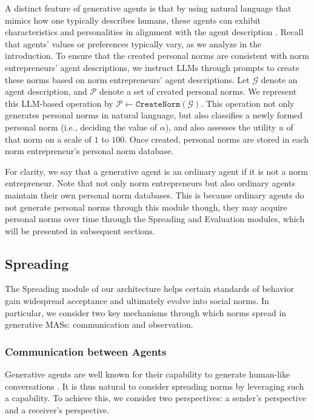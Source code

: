 \documentclass{article}
\begin{document}
A distinct feature of generative agents is that by using natural language that mimics how one typically describes humans, these agents can exhibit characteristics and personalities in alignment with the agent description \cite{shanahan2023role}.
Recall that agents' values or preferences typically vary, as we analyze in the introduction. 
To ensure that the created personal norms are consistent with norm entrepreneurs' agent descriptions, we instruct LLMs through prompts to create these norms based on norm entrepreneurs' agent descriptions. 
Let $\mathcal{G}$ denote an agent description, and $\mathcal{P}$ denote a set of created personal norms. We represent this LLM-based operation by $\mathcal{P} \leftarrow \texttt{CreateNorm}(\mathcal{G})$. This operation not only generates personal norms in natural language, but also classifies a newly formed personal norm (i.e., deciding the value of $\alpha$), and also assesses the utility $u$ of that norm on a scale of $1$ to $100$. Once created, personal norms are stored in  each norm entrepreneur's personal norm database.

For clarity, we say that a generative agent is an ordinary agent if it is not a norm entrepreneur. Note that not only norm entrepreneurs but also ordinary agents maintain their own personal norm databases. This is because ordinary agents do not generate personal norms through this module though, they may acquire personal norms over time through the Spreading and Evaluation modules, which will be presented in subsequent sections.

\subsection{Spreading}
The Spreading module of our architecture helps 
certain standards of behavior gain widespread acceptance and ultimately evolve into social norms. 
In particular, we consider two key mechanisms through which norms spread in generative MASs: communication and observation.

\subsubsection{Communication between Agents}
\label{sec: communication}
Generative agents are well known for their capability to generate human-like conversations \cite{clark2021all}.
It is thus natural to consider spreading norms by leveraging such a capability.
To achieve this, we consider two perspectives: a sender's perspective and a receiver's perspective.
\end{document}
